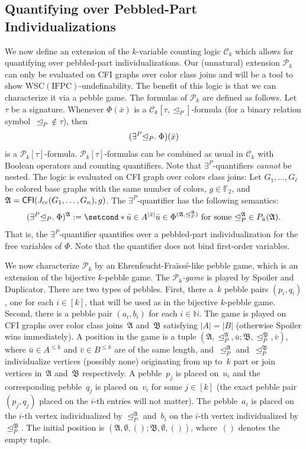 \documentclass[]{lmcs}
\newcommand{\nat}{\mathbb{N}}
\newcommand{\FF}{\mathbb{F}}
\newcommand{\defining}[1]{\emph{#1}}
\newcommand{\qspace}{\mathchoice{\;}{\,}{}{}}
\newcommand{\formA}{\Phi}
\newcommand{\tup}[1]{\bar{#1}}
\newcommand{\Struct}{\mathfrak{A}}
\newcommand{\StructV}{A}
\newcommand{\vertA}{u}
\newcommand{\vertB}{v}
\newcommand{\StructA}{\mathfrak{A}}
\newcommand{\StructB}{\mathfrak{B}}
\newcommand{\StructVA}{A}
\newcommand{\StructVB}{B}
\newcommand{\sig}{\tau}
\newcommand{\IFPC}{\ensuremath{\mathrm{IFPC}}}
\newcommand{\Ck}[1]{\mathcal{C}_{#1}}
\newcommand{\WSCof}[1]{\mathrm{WSC}(#1)}
\newcommand{\CFIsym}{\mathsf{CFI}}
\newcommand{\CFI}[1]{\CFIsym(#1)}
\newcommand{\indRel}{\trianglelefteq}
\newcommand{\Pk}[1]{\mathcal{P}_{#1}}
\newcommand{\existsP}[1]{\exists^P{#1}}
\newcommand{\partind}[2]{P_{#2}(#1)}
\begin{document}
\subsection{Quantifying over Pebbled-Part Individualizations}
\label{sec:quantifying-pebbled-part-individualizations}

We now define an extension of the $k$-variable counting logic $\Ck{k}$
which allows for quantifying over pebbled-part individualizations. 
Our (unnatural) extension $\Pk{k}$ can only be evaluated on CFI graphs over color class joins and will be a tool to show $\WSCof{\IFPC{}}$-undefinability.
The benefit of this logic is that we can characterize it via a pebble game.
The formulas of $\Pk{k}$ are defined as follows. Let~$\sig$ be a signature.
Whenever $\formA(\tup{x})$ is a $\Ck{k}[\sig,\indRel_P]$\nobreakdash-formula
(for a binary relation symbol~${\indRel_P}\notin \sig$), then \[(\existsP{\indRel_P}.\qspace \formA)(\tup{x})\]
is a $\Pk{k}[\sig]$\nobreakdash-formula.
$\Pk{k}[\sig]$-formulas can be combined as usual in $\Ck{k}$
with Boolean operators and counting quantifiers.
Note that $\exists^P$-quantifiers \emph{cannot} be nested.
The logic is evaluated on CFI graph over colors class joins:
Let $G_1,\dots ,G_\ell$ be colored base graphs with the same number of colors,
$g \in \FF_2$, and
$\Struct = \CFI{\ccjoin{G_1,\dots, G_n},g}$.
The $\exists^P$-quantifier has the following semantics:
\[(\existsP{\indRel_P}.\qspace\formA)^{\Struct} := \setcond*{\tup{\vertA} \in \StructV^{|\tup{x}|}}{
	\tup{\vertA} \in \formA^{(\Struct, \indRel_P^\Struct)}
	\text { for some } {\indRel_P^\Struct} \in \partind{\Struct}{\tup{\vertA}}}.\]
That is, the $\exists^P$-quantifier quantifies over a pebbled-part individualization for the free variables of $\formA$.
Note that the quantifier does not bind first-order variables.

We now characterize $\Pk{k}$ by an Ehrenfeucht-Fraïssé-like pebble game,
which is an extension of the bijective $k$-pebble game.
The \defining{$\Pk{k}$-game} is played by Spoiler and Duplicator.
There are two types of pebbles.
First, there a~$k$ pebble pairs $(p_i, q_i)$, one for each $i \in[k]$,
that will be used as in the bijective $k$-pebble game.
Second, there is a pebble pair $(a_i, b_i)$ for each $i \in \nat$.
The game is played on CFI graphs over color class joins~$\StructA$ and~$\StructB$
satisfying $|\StructVA| = |\StructVB|$ (otherwise Spoiler wins immediately).
A position in the game is a tuple $(\StructA, \indRel_P^\StructA, \tup{\vertA}; \StructB, \indRel_P^\StructB, \tup{\vertB})$,
where $\tup{\vertA} \in \StructVA^{\leq k}$ and
$\tup{\vertB} \in \StructVB^{\leq k}$ are of the same length,
and~$\indRel_P^\StructA$ and~$\indRel_P^\StructB$ individualize vertices (possibly none) originating from up to~$k$ part or join vertices in~$\StructA$ and~$\StructB$ respectively.
A pebble~$p_j$ is placed on~$\vertA_i$ and the corresponding pebble~$q_j$ is placed on~$\vertB_i$ for some $j \in [k]$
(the exact pebble pair $(p_j,q_j)$ placed on the $i$-th entries will not matter).
The pebble~$a_i$ is placed on the $i$-th vertex individualized by $\indRel_P^\StructA$
and~$b_i$ on the $i$-th vertex individualized by~$\indRel_P^\StructB$.
The initial position is $(\StructA, \emptyset, (); \StructB, \emptyset, ())$,
where~$()$ denotes the empty tuple.
\end{document}
